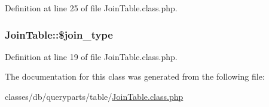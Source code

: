 Definition at line 25 of file Join\+Table.\+class.\+php.

\hypertarget{classJoinTable_a00c6a8c44beb3b85c9f3a3e5be03fba8}{
\subsubsection[{\$join\+\_\+type}]{\setlength{\rightskip}{0pt plus 5cm}Join\+Table\+::\$join\+\_\+type}}\label{classJoinTable_a00c6a8c44beb3b85c9f3a3e5be03fba8}


Definition at line 19 of file Join\+Table.\+class.\+php.



The documentation for this class was generated from the following file\+:\begin{DoxyCompactItemize}
\item 
classes/db/queryparts/table/\hyperlink{JoinTable_8class_8php}{Join\+Table.\+class.\+php}\end{DoxyCompactItemize}
